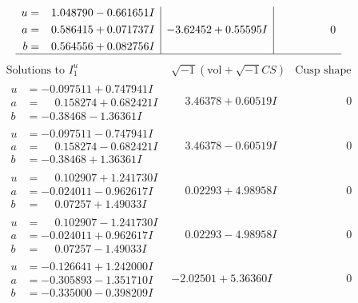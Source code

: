 \documentclass[1p]{elsarticle_modified}
\theoremstyle{definition}
\newcommand{\I}{\sqrt{-1}}
\begin{document}
$$\begin{array}{c|c|c}
\begin{aligned}
u &= \phantom{-}1.048790 - 0.661651 I \\
a &= \phantom{-}0.586415 + 0.071737 I \\
b &= \phantom{-}0.564556 + 0.082756 I\end{aligned}
 & -3.62452 + 0.55595 I & \phantom{-0.000000 } 0\\
 \hline 
 \end{array}$$\newpage$$\begin{array}{c|c|c}  
\text{Solutions to }I^u_{1}& \I (\text{vol} + \sqrt{-1}CS) & \text{Cusp shape}\\
 \hline 
\begin{aligned}
u &= -0.097511 + 0.747941 I \\
a &= \phantom{-}0.158274 + 0.682421 I \\
b &= -0.38468 - 1.36361 I\end{aligned}
 & \phantom{-}3.46378 + 0.60519 I & \phantom{-0.000000 } 0 \\ \hline\begin{aligned}
u &= -0.097511 - 0.747941 I \\
a &= \phantom{-}0.158274 - 0.682421 I \\
b &= -0.38468 + 1.36361 I\end{aligned}
 & \phantom{-}3.46378 - 0.60519 I & \phantom{-0.000000 } 0 \\ \hline\begin{aligned}
u &= \phantom{-}0.102907 + 1.241730 I \\
a &= -0.024011 - 0.962617 I \\
b &= \phantom{-}0.07257 + 1.49033 I\end{aligned}
 & \phantom{-}0.02293 + 4.98958 I & \phantom{-0.000000 } 0 \\ \hline\begin{aligned}
u &= \phantom{-}0.102907 - 1.241730 I \\
a &= -0.024011 + 0.962617 I \\
b &= \phantom{-}0.07257 - 1.49033 I\end{aligned}
 & \phantom{-}0.02293 - 4.98958 I & \phantom{-0.000000 } 0 \\ \hline\begin{aligned}
u &= -0.126641 + 1.242000 I \\
a &= -0.305893 - 1.351710 I \\
b &= -0.335000 - 0.398209 I\end{aligned}
 & -2.02501 + 5.36360 I & \phantom{-0.000000 } 0 \\ \hline\begin{aligned}

\end{aligned}
\end{array}$$
\end{document}
